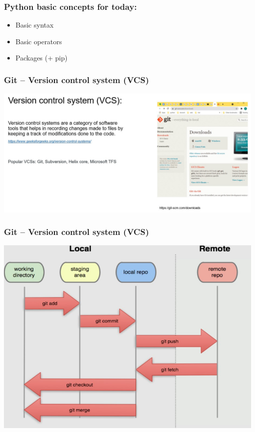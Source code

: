 \documentclass{beamer}
\begin{document}
\begin{frame}
    \frametitle{Python basic concepts for today:}

    \begin{itemize}
        \item Basic syntax
        \item Basic operators
        \item Packages (+ pip) %
    \end{itemize}
\end{frame}

\begin{frame}
    \frametitle{Git – Version control system (VCS)}
    \centering
    \includegraphics[scale = 0.35]{figures/git.jpg}
\end{frame}

\begin{frame}
    \frametitle{Git – Version control system (VCS)}
    \centering
    \includegraphics[scale = 0.5]{figures/git_flow.jpg}
\end{frame}
\end{document}
